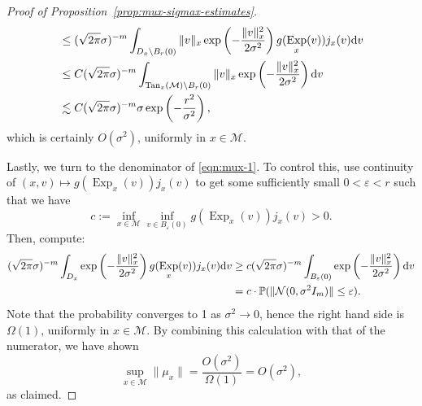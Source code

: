\documentclass[preprint]{imsart}
\theoremstyle{plain}
\theoremstyle{definition}
\newcommand{\Pbb}{\mathbb{P}}
\newcommand{\Ncal}{\mathcal{N}}
\newcommand{\Mcal}{\mathcal{M}}
\newcommand{\diff}{\textnormal{d}}
\DeclareMathOperator{\Tan}{Tan}
\DeclareMathOperator{\Exp}{Exp}
\begin{document}
\begin{appendix}
\begin{proof}[Proof of Proposition~\ref{prop:mux-sigmax-estimates}]
\begin{equation}
\begin{split}
            &\le (\sqrt{2\pi}\sigma)^{-m}\int_{D_x\setminus B_r(0)}\|v\|_x \exp\left(-\frac{\|v\|_x^2}{2\sigma^2}\right)g(\Exp_x(v))j_x(v)\diff v \\
        &\le C(\sqrt{2\pi}\sigma)^{-m}\int_{\Tan_x(\Mcal)\setminus B_r(0)}\|v\|_x \exp\left(-\frac{\|v\|_x^2}{2\sigma^2}\right)\diff v \\
        &\lesssim C(\sqrt{2\pi}\sigma)^{-m}\sigma\exp\left(-\frac{r^2}{\sigma^2}\right),
        \end{split}
    \end{equation}
    which is certainly $O(\sigma^{2})$, uniformly in $x\in\Mcal$.
    
    Lastly, we turn to the denominator of \eqref{eqn:mux-1}.
    To control this, use continuity of $(x,v)\mapsto g(\Exp_x(v))j_x(v)$ to get some sufficiently small $0<\varepsilon<r$ such that we have $$c:=\inf_{x\in\Mcal}\inf_{v\in B_{\varepsilon}(0)}g(\Exp_x(v))j_x(v)>0.$$
    Then, compute:
    \begin{equation}\label{eqn:denom}
        \begin{split}
        (\sqrt{2\pi}\sigma)^{-m}\int_{D_x} \exp\left(-\frac{\|v\|_x^2}{2\sigma^2}\right)g(\Exp_x(v))j_x(v)\diff v &\ge c(\sqrt{2\pi}\sigma)^{-m}\int_{B_{\varepsilon}(0)} \exp\left(-\frac{\|v\|_x^2}{2\sigma^2}\right)\diff v \\
        &= c  \cdot\Pbb(\|\Ncal(0,\sigma^2I_m)\|\le \varepsilon).
        \end{split}
    \end{equation}
    Note that the probability converges to 1 as $\sigma^2\to 0$, hence the right hand side is $\Omega(1)$, uniformly in $x\in\Mcal$.
    By combining this calculation with that of the numerator, we have shown
    \begin{equation}\label{eqn:mu-x}
        \sup_{x\in\Mcal}\|\mu_x\| = \frac{O(\sigma^{2})}{\Omega(1)} = O(\sigma^2),
    \end{equation}
    as claimed.


\end{proof}
\end{appendix}
\end{document}
